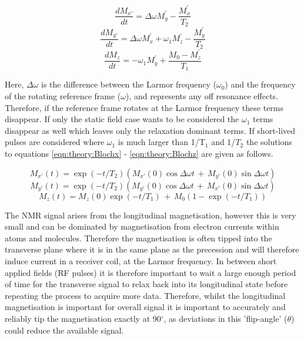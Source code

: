 \documentclass[class=article, crop=false]{standalone}
\begin{document}
\begin{equation}
    \frac{dM_{x'}}{dt} = \Delta\omega M_y^{'} - \frac{M_x^{'}}{T_2}
    \label{eqn:theory:Blochx}
\end{equation}
\begin{equation}
    \frac{dM_{y'}}{dt} = \Delta\omega M_x^{'} + \omega_1M_z^{'} - \frac{M_y^{'}}{T_2}
    \label{eqn:theory:Blochy}
\end{equation}
\begin{equation}
    \frac{dM_z}{dt} = -\omega_1M_y^{'} + \frac{M_0-M_z^{'}}{T_1}
    \label{eqn:theory:Blochz}
\end{equation}

Here, $\Delta\omega$ is the difference between the Larmor frequency ($\omega_0$) and the frequency of the rotating reference frame ($\omega$), and represents any off resonance effects. Therefore, if the reference frame rotates at the Larmor frequency these terms disappear. If only the static field case wants to be considered the $\omega_1$ terms disappear as well which leaves only the relaxation dominant terms. If short-lived pulses are considered where $\omega_1$ is much larger than 1/T$_1$ and 1/$T_2$ the solutions to equations \ref{eqn:theory:Blochx} - \ref{eqn:theory:Blochz} are given as follows.

\begin{equation}
    M_{x'}(t) = \exp(-t/T_2) \left( M_{x'}(0)\cos\Delta\omega t \, + \, M_{y'}(0)\sin\Delta\omega t \right)
\end{equation}
\begin{equation}
    M_{y'}(t) = \exp(-t/T_2) \left( M_{y'}(0)\cos\Delta\omega t \, + \, M_{x'}(0)\sin\Delta\omega t \right)
\end{equation}
\begin{equation}
    M_z(t) = M_z(0)\exp(-t/T_1) \, + \, M_0 \left( 1-\exp(-t/T_1) \right)
\end{equation}

The NMR signal arises from the longitudinal magnetisation, however this is very small and can be dominated by magnetisation from electron currents within atoms and molecules. Therefore the magnetisation is often tipped into the transverse plane where it is in the same plane as the precession and will therefore induce current in a receiver coil, at the Larmor frequency. In between short applied fields (RF pulses) it is therefore important to wait a large enough period of time for the transverse signal to relax back into its longitudinal state before repeating the process to acquire more data. Therefore, whilst the longitudinal magnetisation is important for overall signal it is important to accurately and reliably tip the magnetisation exactly at 90$^\circ$, as deviations in this 'flip-angle' ($\theta$) could reduce the available signal\cite{deGraaf2019InSpectroscopy}.
\end{document}

